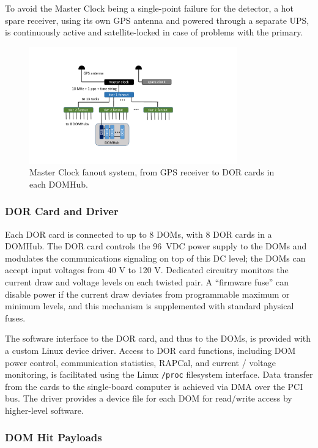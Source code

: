 To avoid the Master Clock being a single-point failure for the detector, a
hot spare receiver, using its own GPS antenna and powered through a
separate UPS, is continuously active and satellite-locked in case of
problems with the primary.

\begin{figure}[!ht]
 \centering
 \includegraphics[width=0.8\textwidth]{graphics/online/data_readout/clock_fanout.pdf}
 \caption{Master Clock fanout system, from GPS receiver to DOR cards in
   each DOMHub.}
 \label{fig:clock_fanout}
\end{figure}

\subsubsection{DOR Card and Driver}

Each DOR card is connected to up to 8 DOMs, with 8 DOR cards in a
DOMHub. The DOR card controls the 96~VDC power supply to the DOMs and
modulates the communications signaling on top of this DC level; the DOMs
can accept input voltages from 40 V to 120 V.
Dedicated circuitry monitors the current draw and voltage levels on each
twisted pair. A ``firmware fuse'' can disable power if the current draw
deviates from programmable maximum or minimum levels, and this mechanism is
supplemented with standard physical fuses.  

The software interface to the DOR card, and thus to the DOMs, is provided
with a custom Linux device driver.  Access to DOR card functions, including
DOM power control, communication statistics, RAPCal, and current / voltage
monitoring, is facilitated using the Linux \texttt{/proc} filesystem
interface.  Data transfer from the cards to the single-board computer is
achieved via DMA over the PCI bus.  The driver
provides a device file for each DOM for read/write access by higher-level software.

\subsubsection{\label{sect:online:payloads}DOM Hit Payloads}

